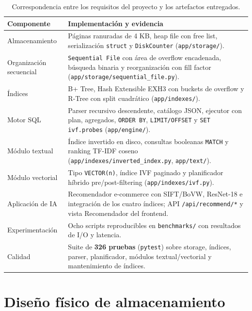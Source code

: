\documentclass[11pt]{article}
\begin{document}
\begin{table}[!htb]
\centering
\caption{Correspondencia entre los requisitos del proyecto y los artefactos
entregados.}
\label{tab:cumplimiento}
\small
\begin{tabular}{@{}>{\raggedright\arraybackslash}p{4.4cm}
                >{\raggedright\arraybackslash}p{9.8cm}@{}}
\toprule
\rowcolor{utecblue!10}\textbf{Componente} & \textbf{Implementación y evidencia} \\
\midrule
Almacenamiento & Páginas ranuradas de 4 KB, heap file con free list,
serialización \texttt{struct} y \texttt{DiskCounter} (\texttt{app/storage/}). \\
Organización secuencial & \texttt{Sequential File} con área de overflow
encadenada, búsqueda binaria y reorganización con fill factor
(\texttt{app/storage/sequential\_file.py}). \\
Índices & B+ Tree, Hash Extensible EXH3 con buckets de overflow y R-Tree
con split cuadrático (\texttt{app/indexes/}). \\
Motor SQL & Parser recursivo descendente, catálogo JSON, ejecutor con plan,
agregados, \texttt{ORDER BY}, \texttt{LIMIT/OFFSET} y
\texttt{SET ivf.probes} (\texttt{app/engine/}). \\
Módulo textual & Índice invertido en disco, consultas booleanas
\texttt{MATCH} y ranking TF-IDF coseno (\texttt{app/indexes/inverted\_index.py},
\texttt{app/text/}). \\
Módulo vectorial & Tipo \texttt{VECTOR(n)}, índice IVF paginado y
planificador híbrido pre/post-filtering (\texttt{app/indexes/ivf.py}). \\
Aplicación de IA & Recomendador e-commerce con SIFT/BoVW, ResNet-18 e
integración de los cuatro índices; API \texttt{/api/recommend/*} y vista
Recomendador del frontend. \\
Experimentación & Ocho scripts reproducibles en \texttt{benchmarks/} con
resultados de I/O y latencia. \\
Calidad & Suite de \textbf{326 pruebas} (\texttt{pytest}) sobre storage,
índices, parser, planificador, módulos textual/vectorial y mantenimiento
de índices. \\
\bottomrule
\end{tabular}
\end{table}

\section{Diseño físico de almacenamiento}
\end{document}
